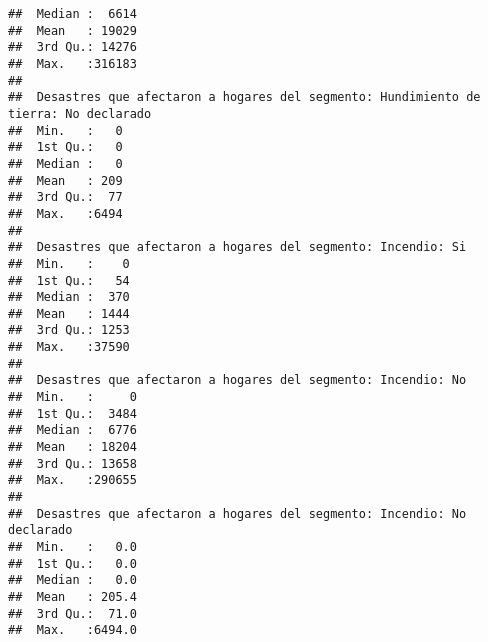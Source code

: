 \documentclass[11pt,]{article}
\begin{document}
\begin{verbatim}
##  Median :  6614                                                           
##  Mean   : 19029                                                           
##  3rd Qu.: 14276                                                           
##  Max.   :316183                                                           
##                                                                           
##  Desastres que afectaron a hogares del segmento: Hundimiento de tierra: No declarado
##  Min.   :   0                                                                       
##  1st Qu.:   0                                                                       
##  Median :   0                                                                       
##  Mean   : 209                                                                       
##  3rd Qu.:  77                                                                       
##  Max.   :6494                                                                       
##                                                                                     
##  Desastres que afectaron a hogares del segmento: Incendio: Si
##  Min.   :    0                                               
##  1st Qu.:   54                                               
##  Median :  370                                               
##  Mean   : 1444                                               
##  3rd Qu.: 1253                                               
##  Max.   :37590                                               
##                                                              
##  Desastres que afectaron a hogares del segmento: Incendio: No
##  Min.   :     0                                              
##  1st Qu.:  3484                                              
##  Median :  6776                                              
##  Mean   : 18204                                              
##  3rd Qu.: 13658                                              
##  Max.   :290655                                              
##                                                              
##  Desastres que afectaron a hogares del segmento: Incendio: No declarado
##  Min.   :   0.0                                                        
##  1st Qu.:   0.0                                                        
##  Median :   0.0                                                        
##  Mean   : 205.4                                                        
##  3rd Qu.:  71.0                                                        
##  Max.   :6494.0                                                        

\end{verbatim}
\end{document}
